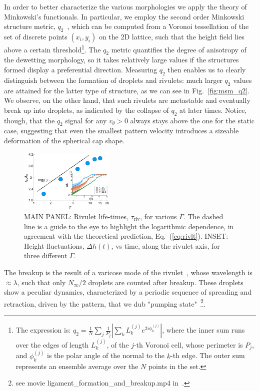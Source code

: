 \documentclass[amsmath,amssymb,showpacs,prf,superscriptaddress, longbibliography]{revtex4-1} %
\begin{document}
In order to better characterize the various morphologies we apply the theory of Minkowski's functionals. 
In particular, we employ the second order Minkowski structure metric, $q_2$~\cite{mickelShortcomingsBondOrientational2013, schallerPapaya22DIrreducible2020}, which can be computed from a Voronoi tessellation of the set of discrete points $(x_i, y_i)$ on the 2D lattice, such that the height field lies above a certain threshold\footnote{The expression is: $q_2 = \frac{1}{N}\sum_j \frac{1}{P_j}|\sum_k L^{(j)}_k e^{2i\phi^{(j)}_k}|$, where the inner sum runs over the edges of length $L^{(j)}_k$, of the $j$-th Voronoi cell, whose perimeter is $P_j$, and $\phi^{(j)}_k$ is the polar angle of the normal to the $k$-th edge. 
The outer sum represents an ensemble average over the $N$ points in the set.}. The $q_2$ metric quantifies the degree of anisotropy of the dewetting morphology, so it takes relatively large values if the structures formed display a preferential direction. 
Measuring $q_2$ then enables us to clearly distinguish between the formation of droplets and rivulets: much larger $q_2$ values are attained for the latter type of structure, as we can see in Fig.~\ref{fig:msm_q2}.
We observe, on the other hand, that such rivulets are metastable and eventually break up into droplets, as indicated by the collapse of $q_2$ at later times. 
Notice, though, that the $q_2$ signal for any $v_{\theta} >0$ always stays above the one for the static case, suggesting that even the smallest pattern velocity introduces a sizeable deformation of the spherical cap shape.
\begin{figure}
    \centering
    \includegraphics[width=0.4\textwidth]{Figure_5.pdf}
    \caption{MAIN PANEL: Rivulet life-times, $\tau_{\text{riv}}$, for various $\Gamma$.
    The dashed line is a guide to the eye to highlight the logarithmic dependence, in agreement with 
    the theoretical prediction, Eq.~(\ref{eq:rivlt}).
    INSET: Height fluctuations, $\Delta h(t)$, vs time, along the rivulet axis, for three different $\Gamma$.
    }
    \label{fig:stab_ligs_lam2}
\end{figure}
The breakup is the result of a varicose mode of the rivulet~\cite{diezBreakupFluidRivulets2009a, mechkovStabilityLiquidRidges2008}, whose wavelength is $\approx\lambda$, such that only $N_{\infty}/2$ droplets are counted after breakup. 
These droplets show a peculiar dynamics, characterized by a periodic sequence of spreading and retraction, driven by the pattern, that we dub "pumping state"~\footnote{see movie ligament\_formation\_and\_breakup.mp4 in~\cite{SuppMat}.}.
\end{document}
